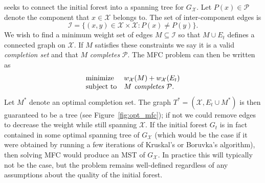 \mfc{} seeks to connect the initial forest into a spanning tree for $G_\mathcal{X}$. Let $P(x) \in \mathcal{P}$ denote the component that $x \in \mathcal{X}$ belongs to. The set of inter-component edges is
\begin{equation*}
	\label{eq:intercomponent}
	\mathcal{I} = \{ (x, y) \in \mathcal{X} \times \mathcal{X} \colon P(x) \neq P(y) \}.
\end{equation*}
We wish to find a minimum weight set of edges $M \subseteq \mathcal{I}$ so that $M\cup E_t$ defines a connected graph on $\mathcal{X}$. If $M$ satisfies these constraints we say it is a valid \emph{completion set} and that $M$ \emph{completes} $\mathcal{P}$. 
The MFC problem can then be written as
\begin{equation}
	\label{eq:mfc}
	\begin{array}{ll}
		\operatorname*{minimize} & w_\mathcal{X}(M) + w_\mathcal{X}(E_t)\\
		\text{subject to} & M \emph{ completes } \mathcal{P}.
	\end{array}
\end{equation}
Let $M^*$ denote an optimal completion set. The graph $T^* = (\mathcal{X}, E_t \cup M^*)$ is then guaranteed to be a tree (see Figure~\ref{fig:opt_mfc}); if not we could remove edges to decrease the weight while still spanning $\mathcal{X}$. If the initial forest $G_t$ is in fact contained in some optimal spanning tree of $G_\mathcal{X}$ (which would be the case if it were obtained by running a few iterations of Kruskal's or Boruvka's algorithm), then solving MFC would produce an MST of $G_\mathcal{X}$. In practice this will typically not be the case, but the problem remains well-defined regardless of any assumptions about the quality of the initial forest.

